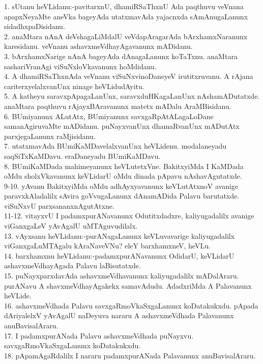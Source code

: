 \documentclass{article}
\begin{document}
1. sUtanu heVLidanu:-pavitarxnU, dhamiRSaThxnU Ada paqthuvu veVnana apapxNeyaMte aneVka bageyAda utatxmavAda yajacnxda sAmAnugaLanunx sidadhxpaDisidanu.\\
2. anaMtara nAnA deVshagaLiMdalU veVdapAragarAda bArxhamxNaranunx karesidanu. veVnanu ashavxmeVdhayAgavanunx mADidanu.\\
3. bArxhamxNarige nAnA bageyAda dAnagaLanunx koTaTxnu. anaMtara sashariVranAgi viSuNxloVkavanunx hoMdidanu.\\
4. A dhamiRSaThxnAda veVnanu viSuNxvinoDaneyeV irutitxruvanu. A rAjana cariterxyelalxvanUnx ninage heVLidudAyitu.\\
5. A katheyu saravxpApagaLanUnx, saravxduHKagaLanUnx nAshamADutatxde. anaMtara paqthuvu rAjayxBAravanunx matetx mADalu AraMBisidanu.\\
6. BUmiyanunx ALutAtx, BUmiyanunx savxgaRpAtALagaLoDane samanAgiruvaMte mADidanu. puNayxvanUnx dhamaRvanUnx mADutAtx parxjegaLanunx raMjisidanu.\\
7. utatxmavAda BUmiKaMDavelalxvanUnx heVLidenu. modalaneyadu saqSiTxKaMDavu. eraDaneyadu BUmiKaMDavu.\\
8. BUmiKaMDada mahimeyanunx heVLutetxVne. BakitxyiMda I KaMDada oMdu sholxVkavanunx keVLidarU oMdu dinada pApavu nAshavAgutatxde.\\
9-10. yAvanu BakitxyiMda oMdu adhAyxyavanunx keVLutAtxnoV avanige paravxkAladalilx sAvira goVvugaLanunx dAnamADida Palavu barutatxde. viSuNxvU parxsananxnAgutAtxne.\\
11-12. vitayxvU I padamxpurANavanunx Odutitxdadxre, kaliyugadalilx avanige viGanxgaLeV yAvAgalU uMTAguvudilalx.\\
13. vAyxsanu heVLidanu:-purANagaLanunx keVLuvavarige kaliyugadalilx viGanxgaLuMTAgalu kAraNaveVNu? eleY barxhamxneV, heVLu.\\
14. barxhamxnu heVLidanu:-padamxpurANavanunx OdidarU, keVLidarU ashavxmeVdhayAgada Palavu laBisutatxde.\\
15. puNayxparxdavAda ashavxmeVdhavanunx kaliyugadalilx mADalAraru. purANavu A shavxmeVdhayAgakekx samavAdudu. AdadxriMda A Palavanunx heVLide.\\
16. ashavxmeVdhada Palavu savxgaRmoVkaSxgaLanunx koDatakukxdu. pApada dAriyalelxV yAvAgalU naDeyuva nararu A ashavxmeVdhada Palavanunx anuBavisalAraru.\\
17. I padamxpurANada Palavu ashavxmeVdhada puNayxvu. savxgaRmoVkaSxgaLanunx koDatakukxdu.\\
18. pApamAgaRdalilx I nararu padamxpurANada Palavanunx anuBavisalAraru.\\
\end{document}
